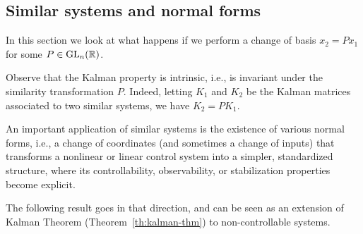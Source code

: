 \subsection{Similar systems and normal forms}

In this section we look at what happens if we perform a change of basis $x_2 = Px_1$ for some $P\in \operatorname{GL}_n(\mathbb{R})$.


Observe that the Kalman property is intrinsic, i.e., is invariant under the similarity transformation $P$.
Indeed, letting $K_1$ and $K_2$ be the Kalman matrices associated to two similar systems, we have $K_2=PK_1$.

An important application of similar systems is the existence of various normal forms, i.e., a change of coordinates (and sometimes a change of inputs) that transforms a nonlinear or linear control system into a simpler, standardized structure, where its controllability, observability, or stabilization properties become explicit.

The following result goes in that direction, and can be seen as an extension of Kalman Theorem (Theorem~\ref{th:kalman-thm}) to non-controllable systems.


